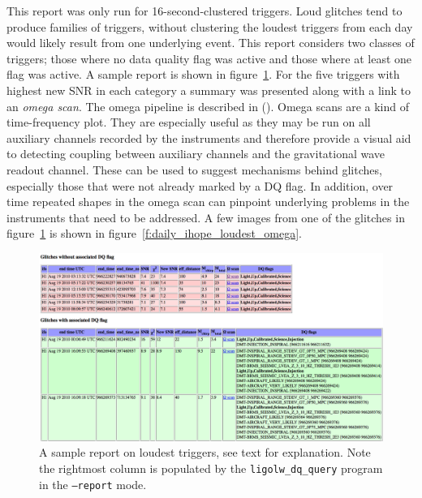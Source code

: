 This report was only run for 16-second-clustered triggers.  Loud
glitches tend to produce families of triggers, without clustering the
loudest triggers from each day would likely result from one underlying
event.  This report considers two classes of triggers; those where no
data quality flag was active and those where at least one flag was
active.  A sample report is shown in
figure~\ref{f:daily_ihope_loudest}.  For the five triggers with
highest new SNR in each category a summary was presented along with a
link to an \emph{omega scan}.  The omega pipeline is described in
().  Omega scans are a kind of time-frequency
plot.  They are especially useful as they may be run on all auxiliary
channels recorded by the instruments and therefore provide a visual
aid to detecting coupling between auxiliary channels and the
gravitational wave readout channel.  These can be used to suggest
mechanisms behind glitches, especially those that were not already
marked by a DQ flag.  In addition, over time repeated shapes in the
omega scan can pinpoint underlying problems in the instruments that
need to be addressed.  A few images from one of the glitches in
figure~\ref{f:daily_ihope_loudest} is shown in
figure~\ref{f:daily_ihope_loudest_omega}.

\begin{figure}
  \includegraphics[width=\linewidth]{figures/detchar/loudest.png}
  \caption[Sample loudest trigger report from Aug 19, 2010]{
  \label{f:daily_ihope_loudest}
A sample report on loudest triggers, see text for explanation.  Note the
rightmost column is populated by
the \texttt{ligolw\_dq\_query} program in the \texttt{--report} mode.}
\end{figure}%



